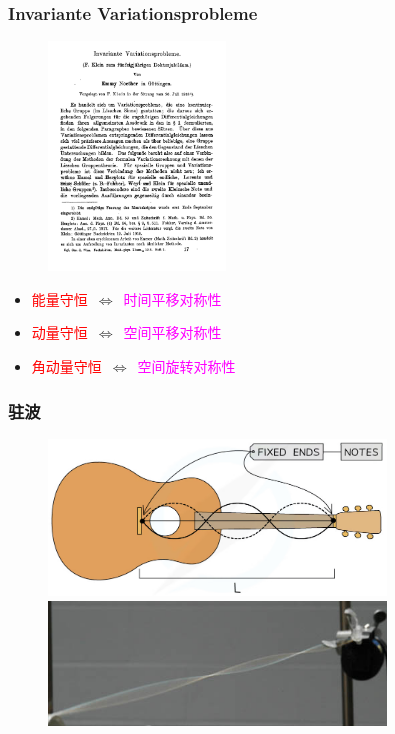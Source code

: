 \frame
{
	\frametitle{\textrm{Invariante Variationsprobleme}}
\begin{figure}[h!]
\centering
%
\vspace{-10.5pt}
\includegraphics[height=0.52\textwidth,width=0.42\textwidth,viewport=0 0 450 580,clip]{Figures/Noether_theorem-1st_page.png}
\label{Noether_theorem}
\end{figure}
\begin{itemize}
\centering
	\item \textcolor{red}{能量守恒}~$\Longleftrightarrow$~\textcolor{magenta}{时间平移对称性}
	\item \textcolor{red}{动量守恒}~$\Longleftrightarrow$~\textcolor{magenta}{空间平移对称性}
	\item \textcolor{red}{角动量守恒}~$\Longleftrightarrow$~\textcolor{magenta}{空间旋转对称性}
\end{itemize}
}

\frame
{
	\frametitle{\textrm{驻波}}
\begin{figure}[h!]
\centering
\vspace{-15.5pt}
\includegraphics[height=0.40\textwidth,width=0.8\textwidth,viewport=0 0 900 450,clip]{Figures/Guitar-string.png}
\vskip 0.1pt
\includegraphics[height=0.35\textwidth,width=0.8\textwidth,viewport=0 0 122 48,clip]{Figures/string-standing-wave.jpg}
\label{Standing_Wave_0}
\end{figure}
}

